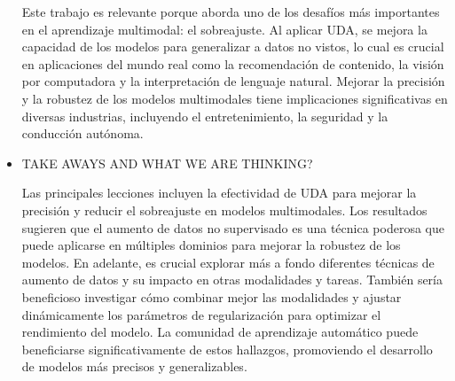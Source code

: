 \documentclass[letter, 11pt, twoside]{report}
\begin{document}
\begin{itemize}
    Este trabajo es relevante porque aborda uno de los desafíos más importantes en el aprendizaje multimodal: el sobreajuste. Al aplicar UDA, se mejora la capacidad de los modelos para generalizar a datos no vistos, lo cual es crucial en aplicaciones del mundo real como la recomendación de contenido, la visión por computadora y la interpretación de lenguaje natural. Mejorar la precisión y la robustez de los modelos multimodales tiene implicaciones significativas en diversas industrias, incluyendo el entretenimiento, la seguridad y la conducción autónoma.
    \item TAKE AWAYS AND WHAT WE ARE THINKING?
    
    Las principales lecciones incluyen la efectividad de UDA para mejorar la precisión y reducir el sobreajuste en modelos multimodales. Los resultados sugieren que el aumento de datos no supervisado es una técnica poderosa que puede aplicarse en múltiples dominios para mejorar la robustez de los modelos. En adelante, es crucial explorar más a fondo diferentes técnicas de aumento de datos y su impacto en otras modalidades y tareas. También sería beneficioso investigar cómo combinar mejor las modalidades y ajustar dinámicamente los parámetros de regularización para optimizar el rendimiento del modelo. La comunidad de aprendizaje automático puede beneficiarse significativamente de estos hallazgos, promoviendo el desarrollo de modelos más precisos y generalizables.
\end{itemize}
\end{document}
